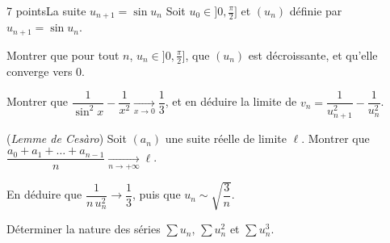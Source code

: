 \begin{exoEval}[Problème]{7 points}{La suite $u_{n+1}=\sin u_n$}
Soit $u_0\in\bigl]0,\frac\pi2\bigr]$ et $(u_n)$ définie par
$u_{n+1}=\sin u_n$.
\begin{questions}
  \item Montrer que pour tout $n$, $u_n\in\bigl]0,\frac\pi2\bigr]$, que
    $(u_n)$ est décroissante, et qu'elle converge vers $0$.
  \item Montrer que $\dfrac{1}{\sin^{2}x}-\dfrac{1}{x^{2}}\xrightarrow[x\to0]{}\dfrac13$,
    et en déduire la limite de $v_n=\dfrac{1}{u_{n+1}^{2}}-\dfrac{1}{u_n^{2}}$.
  \item (\emph{Lemme de Cesàro}) Soit $(a_n)$ une suite réelle de limite
    $\ell$. Montrer que $\dfrac{a_0+a_1+\dots+a_{n-1}}{n}\xrightarrow[n\to+\infty]{}\ell$.
  \item En déduire que $\dfrac{1}{n\,u_n^{2}}\to\dfrac13$, puis que
    $u_n\sim\sqrt{\dfrac3n}$.
  \item Déterminer la nature des séries $\sum u_n$, $\sum u_n^{2}$ et
    $\sum u_n^{3}$.
\end{questions}
\end{exoEval}
